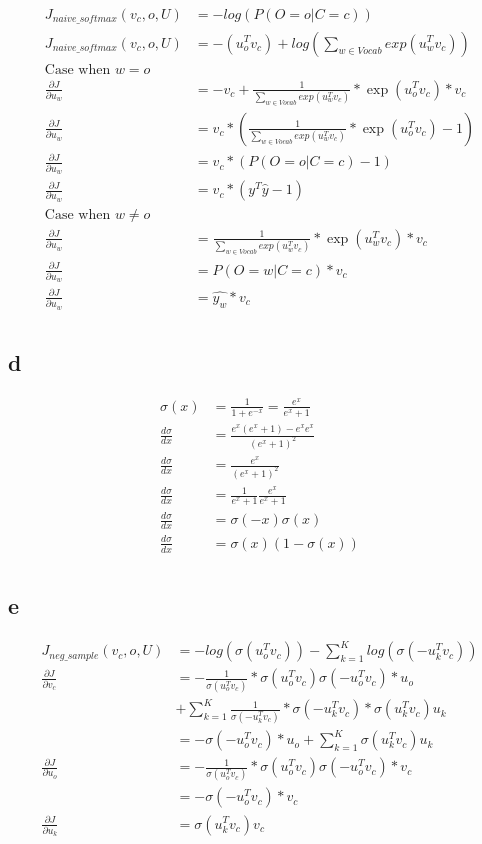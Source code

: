 \documentclass{article}
\newcommand{\pd}[2]{\frac{\partial #1}{\partial #2}}
\newcommand{\der}[2]{\frac{d #1}{d #2}}
\begin{document}
\begin{align*}
	J_{naive\_softmax}(v_c , o , U) &= -log (P(O = o | C =c )) \\
	J_{naive\_softmax}(v_c , o , U) &= -(u_o^T v_c) + log(\sum_{w \in Vocab}exp(u_w^T v_c))\\
	\text{Case when $w = o$} \\
	\pd{J}{u_w} &=  -v_c + \frac{1}{\sum_{w \in Vocab} exp(u_w^T v_c)} * \exp(u_o^T v_c) * v_c\\
	\pd{J}{u_w} &=  v_c * ( \frac{1}{\sum_{w \in Vocab} exp(u_w^T v_c)} * \exp(u_o^T v_c) - 1)\\
	\pd{J}{u_w} &=  v_c * ( P(O = o | C =c )- 1 )\\
	\pd{J}{u_w} &=  v_c * (y^T \hat{y} - 1)\\
	\text{Case when $w \neq o$} \\
	\pd{J}{u_w} &= \frac{1}{\sum_{w \in Vocab} exp(u_w^T v_c)} * \exp(u_w^T v_c) * v_c\\
	\pd{J}{u_w} &=  P(O = w | C =c )* v_c\\
	\pd{J}{u_w} &=   \hat{y_w}* v_c\\
\end{align*}
\subsection{d}
\begin{align*}
	\sigma(x) &= \frac{1}{1 + e^{-x}} = \frac{e^x}{e^x + 1} \\
	\der{\sigma}{x} &= \frac{e^x(e^x + 1) - e^x e^x}{(e^x + 1)^2} \\
	\der{\sigma}{x} &= \frac{e^x}{(e^x + 1)^2} \\
	\der{\sigma}{x} &= \frac{1}{e^x + 1}\frac{e^x}{e^x + 1} \\
	\der{\sigma}{x} &= \sigma(-x) \sigma(x) \\
	\der{\sigma}{x} &= \sigma(x) (1 - \sigma(x)) \\
\end{align*}
\subsection{e}
\begin{align*}
	J_{neg\_sample}(v_c , o , U) &= -log(\sigma(u_o^T v_c)) - \sum_{k=1}^{K} log(\sigma(-u_k^T v_c)) \\
	\pd{J}{v_c} &= - \frac{1}{\sigma(u_o^T v_c)} * \sigma(u_o^T v_c) \sigma(- u_o^T v_c) * u_o \\
		&+ \sum_{k=1}^{K} \frac{1}{\sigma(-u_k^T v_c)} *  \sigma(-u_k^T v_c)* \sigma(u_k^T v_c) u_k \\
		&= - \sigma(-u_o^T v_c) * u_o + \sum_{k=1}^{K} \sigma(u_k^T v_c) u_k \\
	\pd{J}{u_o} &= - \frac{1}{\sigma(u_o^T v_c)} * \sigma(u_o^T v_c) \sigma(- u_o^T v_c) * v_c \\
		&= -  \sigma(- u_o^T v_c) * v_c \\
	\pd{J}{u_k} &= \sigma(u_k^T v_c) v_c \\
\end{align*}
\end{document}
